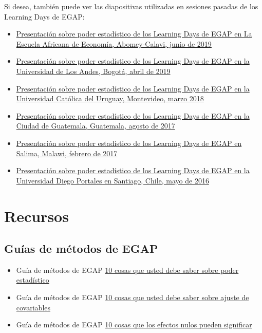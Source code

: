 \documentclass[
  12pt,
  spanish,
]{book}
\begin{document}
Si desea, también puede ver las diapositivas utilizadas en sesiones pasadas de los Learning Days de EGAP:

\begin{itemize}
\item
  \href{https://egap.github.io/learningdays-resources/Slides/Examples/power-benin.pdf}{Presentación sobre poder estadístico de los Learning Days de EGAP en La Escuela Africana de Economía, Abomey-Calavi, junio de 2019}
\item
  \href{https://egap.github.io/learningdays-resources/Slides/Examples/power-bogota.pdf}{Presentación sobre poder estadístico de los Learning Days de EGAP en la Universidad de Los Andes, Bogotá, abril de 2019}
\item
  \href{https://egap.github.io/learningdays-resources/Slides/Examples/power-montevideo.pdf}{Presentación sobre poder estadístico de los Learning Days de EGAP en la Universidad Católica del Uruguay, Montevideo, marzo 2018}
\item
  \href{https://egap.github.io/learningdays-resources/Slides/Examples/power-guatemala.html}{Presentación sobre poder estadístico de los Learning Days de EGAP en la Ciudad de Guatemala, Guatemala, agosto de 2017}
\item
  \href{https://egap.github.io/learningdays-resources/Slides/Examples/power-malawi.pdf}{Presentación sobre poder estadístico de los Learning Days de EGAP en Salima, Malawi, febrero de 2017}
\item
  \href{https://egap.github.io/learningdays-resources/Slides/Examples/power-santiago.pdf}{Presentación sobre poder estadístico de los Learning Days de EGAP en la Universidad Diego Portales en Santiago, Chile, mayo de 2016}
\end{itemize}

\hypertarget{recursos-5}{%
\section{Recursos}\label{recursos-5}}

\hypertarget{guuxedas-de-muxe9todos-de-egap-4}{%
\subsection{Guías de métodos de EGAP}\label{guuxedas-de-muxe9todos-de-egap-4}}

\begin{itemize}
\item
  Guía de métodos de EGAP \href{https://egap.org/resource/10-things-you-need-know-about-statistical-power/}{10 cosas que usted debe saber sobre poder estadístico}
\item
  Guía de métodos de EGAP \href{https://egap.org/resource/10-things-to-know-about-covariate-adjustment/}{10 cosas que usted debe saber sobre ajuste de covariables}
\item
  Guía de métodos de EGAP \href{https://egap.org/resource/10-things-your-null-result-might-mean/}{10 cosas que los efectos nulos pueden significar}
\end{itemize}
\end{document}
